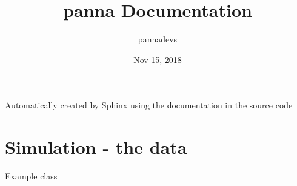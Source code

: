 \documentclass[letterpaper,10pt,english]{sphinxmanual}
\title{panna Documentation}
\date{Nov 15, 2018}
\author{pannadevs}
\begin{document}
\pagestyle{empty}
\maketitle
\pagestyle{plain}
\sphinxtableofcontents
\pagestyle{normal}
\label{\detokenize{index::doc}}


Automatically created by Sphinx using the
documentation in the source code


\chapter{Simulation - the data}
\label{\detokenize{neuralnet/simulation:simulation-the-data}}\label{\detokenize{neuralnet/simulation::doc}}\label{\detokenize{neuralnet/simulation:module-simulation}}

\begin{fulllineitems}
\label{\detokenize{neuralnet/simulation:simulation.Example}}
Example class

\end{fulllineitems}

\end{document}
